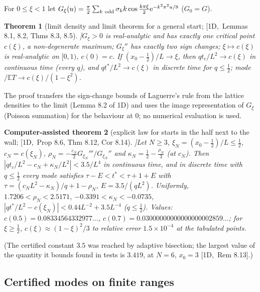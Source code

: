 \documentclass[10pt,a4paper]{article}
\theoremstyle{plain}
\newtheorem{theorem}{Theorem}[section]
\newtheorem{catheorem}[theorem]{Computer-assisted theorem}
\theoremstyle{definition}
\newcommand{\src}[2]{[\textsf{#1},~#2]}           %
\newcommand{\ONE}{\textsf{1D}}
\newcommand{\E}{\mathbb{E}}
\newcommand{\ee}{\mathrm{e}}
\begin{document}
For $0\le\xi<1$ let $G_\xi(u)=\frac\pi2\sum_{k\ \rm odd}\sigma_kk\cos\frac{k\pi\xi}2\ee^{-k^2\pi^2u/8}$ ($G_0=G$).

\begin{theorem}[limit density and limit theorem for a general start; \src{\ONE}{Lemmas 8.1, 8.2, Thms 8.3, 8.5}]\label{thm:1d-generalstart}
$G_\xi>0$ is real-analytic and has exactly one critical point $c(\xi)$, a non-degenerate maximum; $G_\xi''$ has exactly two sign changes; $\xi\mapsto c(\xi)$ is real-analytic on $[0,1)$, $c(0)=c$. If $(x_0-\frac12)/L\to\xi$, then $qt_c/L^2\to c(\xi)$ in continuous time (every $q$), and $qt^*/L^2\to c(\xi)$ in discrete time for $q\le\frac12$; mode$/\E T\to c(\xi)/(1-\xi^2)$.
\end{theorem}
The proof transfers the sign-change bounds of Laguerre's rule from the lattice densities to the limit (Lemma 8.2 of \ONE) and uses the image representation of $G_\xi$ (Poisson summation) for the behaviour at $0$; no numerical evaluation is used.

\begin{catheorem}[explicit law for starts in the half next to the wall; \src{\ONE}{Prop 8.6, Thm 8.12, Cor 8.14}]\label{thm:1d-startlaw}
Let $N\ge3$, $\xi_N=(x_0-\frac12)/L\le\frac12$, $c_N=c(\xi_N)$, $\rho_N=-\frac{c_N}2G_{\xi_N}'''/G_{\xi_N}''$ and $\kappa_N=\frac12-\frac{\rho_N}3$ (at $c_N$). Then $|qt_c/L^2-c_N+\kappa_N/L^2|<3.5/L^4$ in continuous time, and in discrete time with $q\le\frac12$ every mode satisfies $\tau-E<t^*<\tau+1+E$ with $\tau=(c_NL^2-\kappa_N)/q+1-\rho_N$, $E=3.5/(qL^2)$. Uniformly, $1.7206<\rho_N<2.5171$, $-0.3391<\kappa_N<-0.0735$, $|qt^*/L^2-c(\xi_N)|<0.44L^{-2}+3.5L^{-4}$ ($q\le\frac12$). Values: $c(0.5)=0.08334564332977\ldots$, $c(0.7)=0.03000000000000000002859\ldots$; for $\xi\ge\frac12$, $c(\xi)\approx(1-\xi)^2/3$ to relative error $1.5\times10^{-4}$ at the tabulated points.
\end{catheorem}
(The certified constant $3.5$ was reached by adaptive bisection; the largest value of the quantity it bounds found in tests is $3.419$, at $N=6$, $x_0=3$ \src{\ONE}{Rem 8.13}.)

\subsection{Certified modes on finite ranges}
\end{document}
